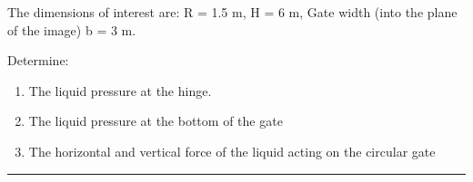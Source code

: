 \documentclass[12pt]{article}
\begin{document}
\begin{enumerate}
The dimensions of interest are: R = 1.5 m, H = 6 m, Gate width (into the plane of the image) b = 3 m.

Determine:
\begin{enumerate}
\item The liquid pressure at the hinge.
\item The liquid pressure at the bottom of the gate
\item The horizontal and vertical force of the liquid acting on the circular gate
\end{enumerate}
\noindent\rule{\linewidth}{0.4pt}
\end{enumerate}
\end{document}
